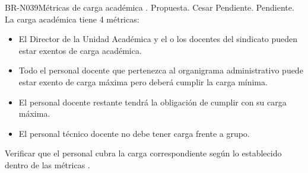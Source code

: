 \begin{BusinessRule}{BR-N039}{Métricas de carga académica}
	{\bcCondition}    %
	{\btEnabler}     %
	{\blControlling}    %
	.
	\BRItem[Estado] Propuesta.
	 Cesar
	 Pendiente.
	 Pendiente.
	\BRItem[Descripción] La carga académica tiene 4 métricas:
	\begin{itemize}
		\item El Director de la Unidad Académica y el o los docentes del sindicato pueden estar exentos de carga académica.
		\item Todo el personal docente que pertenezca al organigrama administrativo puede estar exento de carga máxima pero deberá cumplir la carga mínima.
		\item El personal docente restante tendrá la obligación de cumplir con su carga máxima.
		\item El personal técnico docente no debe tener carga frente a grupo.
	\end{itemize}
	\BRItem[Motivación] Verificar que el personal cubra la carga correspondiente según lo establecido dentro de las métricas .
\end{BusinessRule}

